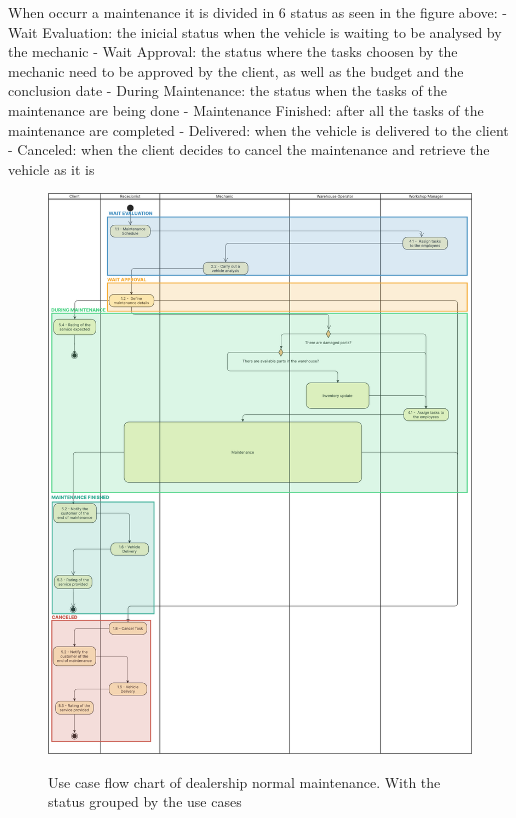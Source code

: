 When occurr a maintenance it is divided in 6 status as seen in the figure above:
- Wait Evaluation: the inicial status when the vehicle is waiting to be analysed by the mechanic
- Wait Approval: the status where the tasks choosen by the mechanic need to be approved by the client, as well as the budget and the conclusion date
- During Maintenance: the status when the tasks of the maintenance are being done
- Maintenance Finished: after all the tasks of the maintenance are completed
- Delivered: when the vehicle is delivered to the client
- Canceled: when the client decides to cancel the maintenance and retrieve the vehicle as it is


\begin{figure}[h]
  \caption{Use case flow chart of dealership normal maintenance. With the status grouped by the use cases}
  \centering
  \includegraphics[width=\textwidth]{figs/Status/Maintenance/UseCaseStatus}
  \label{fig:figure2}
\end{figure}

